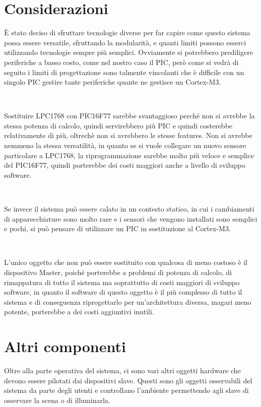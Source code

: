 \documentclass[a4paper,titlepage]{book}
\begin{document}
\section{Considerazioni}

È stato deciso di sfruttare tecnologie diverse per far capire come questo sistema possa essere versatile, sfruttando la modularità, e quanti limiti possono esserci utilizzando tecnologie sempre più semplici. Ovviamente si potrebbero prediligere periferiche a basso costo, come nel nostro caso il PIC, però come si vedrà di seguito i limiti di progettazione sono talmente vincolanti che è difficile con un singolo PIC gestire tante periferiche quante ne gestisce un Cortex-M3.

~

Sostituire LPC1768 con PIC16F77 sarebbe svantaggioso perché non si avrebbe la stessa potenza di calcolo, quindi servirebbero più PIC e quindi costerebbe relativamente di più, oltrechè non si avrebbero le stesse features. Non si avrebbe nemmeno la stessa versatilità, in quanto se si vuole collegare un nuovo sensore particolare a LPC1768, la riprogrammazione sarebbe molto più veloce e semplice del PIC16F77, quindi porterebbe dei costi maggiori anche a livello di sviluppo software.

~

Se invece il sistema può essere calato in un contesto statico, in cui i cambiamenti di apparecchiature sono molto rare e i sensori che vengono installati sono semplici e pochi, si può pensare di utilizzare un PIC in sostituzione al Cortex-M3.

~

L'unico oggetto che non può essere sostituito con qualcosa di meno costoso è il dispositivo Master, poiché porterebbe a problemi di potenza di calcolo, di rimappatura di tutto il sistema ma soprattutto di costi maggiori di sviluppo software, in quanto il software di questo oggetto è il più complesso di tutto il sistema e di conseguenza riprogettarlo per un'architettura diversa, magari meno potente, porterebbe a dei costi aggiuntivi inutili. 


\section{Altri componenti}

Oltre alla parte operativa del sistema, ci sono vari altri oggetti hardware che devono essere pilotati dai dispositivi slave. Questi sono gli oggetti osservabili del sistema da parte degli utenti e controllano l'ambiente permettendo agli slave di osservare la scena o di illuminarla.
\end{document}
